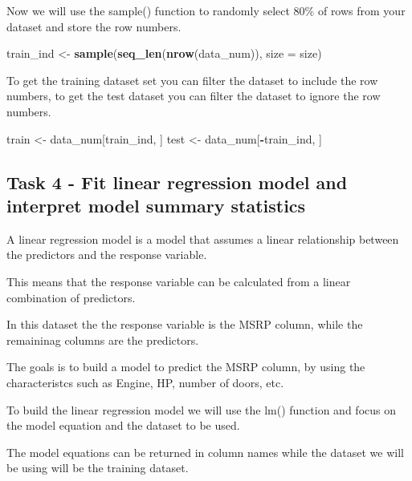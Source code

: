 \documentclass[
]{article}
\newenvironment{Shaded}{\begin{snugshade}}{\end{snugshade}}
\newcommand{\DataTypeTok}[1]{\textcolor[rgb]{0.13,0.29,0.53}{#1}}
\newcommand{\KeywordTok}[1]{\textcolor[rgb]{0.13,0.29,0.53}{\textbf{#1}}}
\newcommand{\NormalTok}[1]{#1}
\newcommand{\OperatorTok}[1]{\textcolor[rgb]{0.81,0.36,0.00}{\textbf{#1}}}
\newcommand{\StringTok}[1]{\textcolor[rgb]{0.31,0.60,0.02}{#1}}
\begin{document}
Now we will use the sample() function to randomly select 80\% of rows
from your dataset and store the row numbers.

\begin{Shaded}
\begin{Highlighting}[]
\NormalTok{train_ind <-}\StringTok{ }\KeywordTok{sample}\NormalTok{(}\KeywordTok{seq_len}\NormalTok{(}\KeywordTok{nrow}\NormalTok{(data_num)), }\DataTypeTok{size =}\NormalTok{ size)}
\end{Highlighting}
\end{Shaded}

To get the training dataset set you can filter the dataset to include
the row numbers, to get the test dataset you can filter the dataset to
ignore the row numbers.

\begin{Shaded}
\begin{Highlighting}[]
\NormalTok{train <-}\StringTok{ }\NormalTok{data_num[train_ind, ]}
\NormalTok{test <-}\StringTok{ }\NormalTok{data_num[}\OperatorTok{-}\NormalTok{train_ind, ]}
\end{Highlighting}
\end{Shaded}

\hypertarget{task-4---fit-linear-regression-model-and-interpret-model-summary-statistics}{%
\subsection{Task 4 - Fit linear regression model and interpret model
summary
statistics}\label{task-4---fit-linear-regression-model-and-interpret-model-summary-statistics}}

A linear regression model is a model that assumes a linear relationship
between the predictors and the response variable.

This means that the response variable can be calculated from a linear
combination of predictors.

In this dataset the the response variable is the MSRP column, while the
remaininag columns are the predictors.

The goals is to build a model to predict the MSRP column, by using the
characteristcs such as Engine, HP, number of doors, etc.

To build the linear regression model we will use the lm() function and
focus on the model equation and the dataset to be used.

The model equations can be returned in column names while the dataset we
will be using will be the training dataset.
\end{document}
